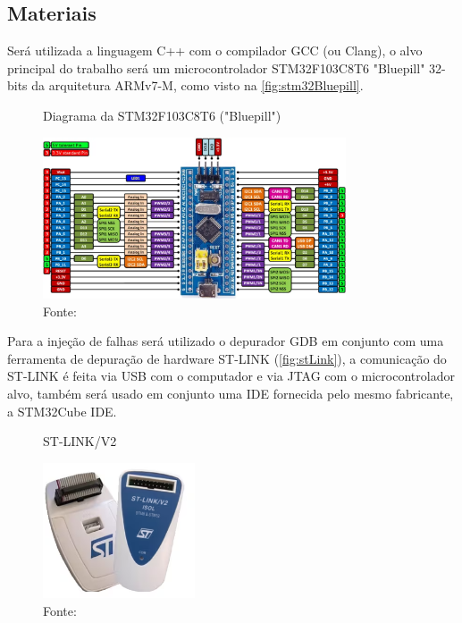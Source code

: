 \subsection{Materiais}

Será utilizada a linguagem C++ com o compilador GCC (ou Clang), o alvo principal do trabalho será um microcontrolador STM32F103C8T6 "Bluepill" 32-bits da arquitetura ARMv7-M, como visto na \autoref{fig:stm32Bluepill}.

\begin{figure}[H]
    \centering
    \captionsetup{justification=centering}
    \caption{Diagrama da STM32F103C8T6 ("Bluepill")}
    \includegraphics[width=0.80\textwidth]{assets/stm32_bluepill.png}
    \captionsetup{justification=raggedright}
    \caption*{Fonte: }
    \label{fig:stm32Bluepill}
\end{figure}

Para a injeção de falhas será utilizado o depurador GDB em conjunto com uma ferramenta de depuração de hardware ST-LINK (\autoref{fig:stLink}), a comunicação do ST-LINK é feita via USB com o computador e via JTAG com o microcontrolador alvo, também será usado em conjunto uma IDE fornecida pelo mesmo fabricante, a STM32Cube IDE.

\begin{figure}[H]
    \centering
    \captionsetup{justification=centering}
    \caption{ST-LINK/V2}
    \includegraphics[width=0.40\textwidth]{assets/st_link.png}
    \captionsetup{justification=raggedright}
    \caption*{Fonte: }
    \label{fig:stLink}
\end{figure}

